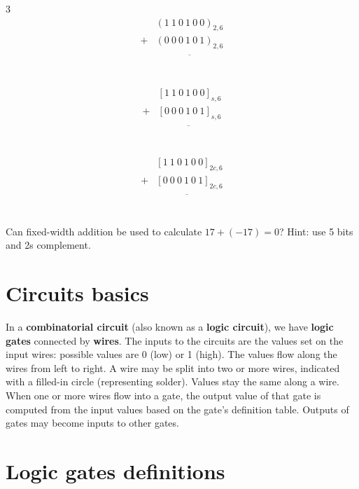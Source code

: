 \documentclass[12pt, oneside]{article}
\begin{document}
\begin{multicols}{3}
   \begin{align*}
      & (1~ 1~ 0~ 1~ 0~ 0)_{2,6}\\
   + & (0~ 0~ 0~ 1~ 0~ 1)_{2,6}\\
   &\overline{\phantom{(1~1~1~0~0~1)_{2,6}}}\\
   \end{align*}
   
   \begin{align*}
      & [1~ 1~ 0~ 1~ 0~ 0]_{s,6}\\
   + & [0~ 0~ 0~ 1~ 0~ 1]_{s,6}\\
   &\overline{\phantom{(1~1~1~0~0~1)_2}}\\
   \end{align*}
   
   \begin{align*}
      & [1~ 1~ 0~ 1~ 0~ 0]_{2c,6}\\
   + & [0~ 0~ 0~ 1~ 0~ 1]_{2c,6}\\
   &\overline{\phantom{(1~1~1~0~0~1)_2}}\\
   \end{align*}
\end{multicols}
\vfill

Can fixed-width addition be used to calculate $17 + (-17) = 0$?
Hint: use 5 bits and 2s complement.

\vfill


\newpage \vfill
\section*{Circuits basics}


In a {\bf combinatorial circuit} (also known as
a {\bf logic circuit}), we have {\bf logic gates} 
connected
by {\bf wires}. The inputs to the circuits are the 
values set on the input wires: possible
values are 0 (low) or 1 (high). The values
flow along the wires from left to right.
A wire may be split into two or more wires, 
indicated with a filled-in circle (representing
solder). Values stay the same along a wire. When 
one or more wires flow into a gate, the output 
value of that gate is computed
from the input values based on the gate's definition
table. Outputs of gates may become inputs to other
gates.  \vfill
\section*{Logic gates definitions}
\end{document}
